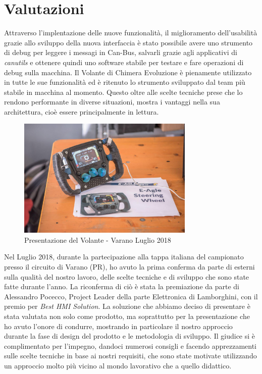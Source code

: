 \chapter{Valutazioni}

Attraverso l'implentazione delle nuove funzionalità, il miglioramento dell'usabilità grazie allo sviluppo della nuova
interfaccia è stato possibile avere uno strumento di debug per leggere i messagi in Can-Bus,
salvarli grazie agli applicativi di \emph{canutils} e ottenere quindi uno software stabile per testare e fare operazioni di
debug sulla macchina.
Il Volante di Chimera Evoluzione è pienamente utilizzato in tutte le sue funzionalità ed è ritenuto lo strumento 
sviluppato dal team più stabile in macchina al momento. Questo oltre alle scelte tecniche prese che lo rendono performante 
in diverse situazioni, mostra i vantaggi nella sua architettura, cioè essere principalmente in lettura.

\begin{figure}[hbt!]
    \centering
    \includegraphics[width=0.75\textwidth]{./figures/steeringwheelPresentation.jpg}
    \caption{Presentazione del Volante - Varano Luglio 2018}
\end{figure}

Nel Luglio 2018, durante la partecipazione alla tappa italiana del campionato presso il circuito di Varano (PR), ho avuto la prima conferma da parte 
di esterni sulla qualità del nostro lavoro, delle scelte tecniche e di sviluppo che sono state fatte durante l'anno.
La riconferma di ciò è stata la premiazione da parte di Alessandro Pocecco, Project Leader della parte Elettronica di Lamborghini, 
con il premio per \emph{Best HMI Solution}.
La soluzione che abbiamo deciso di presentare è stata valutata non solo come prodotto, ma soprattutto per la presentazione che ho avuto
l'onore di condurre, mostrando in particolare il nostro approccio durante la fase di design del prodotto e le metodologia di sviluppo.
Il giudice si è complimentato per l'impegno, dandoci numerosi consigli e facendo apprezzamenti sulle scelte tecniche in base ai nostri requisiti,
che sono state motivate utilizzando un approccio molto più vicino al mondo lavorativo che a quello didattico.

